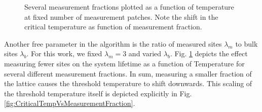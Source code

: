 \documentclass[twocolumn,superscriptaddress,aps,prb,floatfix]{revtex4-1}
\newcommand{\figref}[1]{Fig. \ref{#1}}
\begin{document}
\begin{figure}
\begin{center}
\end{center}
\caption{Several measurement fractions plotted as a function of temperature at fixed number of measurement patches.  Note the shift in the critical temperature as function of measurement fraction.}
\label{fig:LifetimeVsMeasurementFraction}
\end{figure}

Another free parameter in the algorithm is the ratio of measured sites $\lambda_m$ to bulk sites $\lambda_b$.  For this work, we fixed $\lambda_m=3$ and varied $\lambda_b$.  \figref{fig:LifetimeVsMeasurementFraction} depicts the effect measuring fewer sites on the system lifetime as a function of Temperature for several different measurement fractions.  In sum, measuring a smaller fraction of the lattice causes the threshold temperature to shift downwards.  This scaling of the threshold temperature itself is depicted explicitly in \figref{fig:CriticalTempVsMeasurementFraction}.
\end{document}

